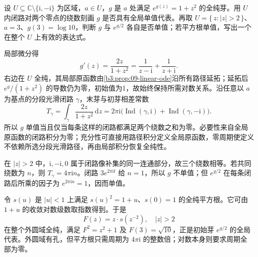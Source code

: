 \begin{exercise}\label{b3:ex:09-2}
设 \(U\subseteq\mathbb C\setminus\{\mathrm i,-\mathrm i\}\) 为区域，\(a\in U\)，\(g\) 是 \(a\) 处满足 \(e^{g(z)}=1+z^2\) 的全纯芽。用 \(U\) 内闭路对两个零点的绕数刻画 \(g\) 是否具有全局单值代表。再取 \(U=\{\,z:|z|>2\,\}\)、\(a=3\)、\(g(3)=\log10\)，判断 \(g\) 与 \(e^{g/2}\) 各自是否单值；若平方根单值，写出一个在整个 \(U\) 上有效的表达式。
\end{exercise}
\begin{solution}
局部微分得
\[
 g'(z)=\frac{2z}{1+z^2}
 =\frac1{z-\mathrm i}+\frac1{z+\mathrm i}.
\]
右边在 \(U\) 全纯，其局部原函数由\cref{b3:prop:09-linear-ode}沿所有路径延拓；延拓后 \(e^g/(1+z^2)\) 的导数仍为零，初始值为1，故始终保持所需对数关系。沿任意以 \(a\) 为基点的分段光滑闭路 \(\gamma\)，末芽与初芽相差常数
\[
 T_\gamma
 =\int_\gamma\frac{2z}{1+z^2}\,\mathrm dz
 =2\pi\mathrm i\bigl(\operatorname{Ind}(\gamma,\mathrm i)
                   +\operatorname{Ind}(\gamma,-\mathrm i)\bigr).
\]
所以 \(g\) 单值当且仅当每条这样的闭路都满足两个绕数之和为零。必要性来自全局原函数的闭路积分为零；充分性可直接用路径积分定义全局原函数，零周期使定义不依赖所选分段光滑路径，再由局部积分恢复全纯性。

在 \(|z|>2\) 中，\(\mathrm i,-\mathrm i,0\) 属于闭路像补集的同一连通部分，故三个绕数相等。若共同绕数为 \(n\)，则 \(T_\gamma=4\pi\mathrm i n\)。闭路 \(3e^{2\pi\mathrm i t}\) 给 \(n=1\)，所以 \(g\) 不单值；但 \(e^{g/2}\) 在每条闭路后所乘的因子为 \(e^{2\pi\mathrm i n}=1\)，因而单值。

令 \(s(u)\) 是 \(|u|<1\) 上满足 \(s(u)^2=1+u\)、\(s(0)=1\) 的全纯平方根。它可由 \(1+u\) 的收敛对数级数取指数得到。于是
\[
 F(z)=z\cdot s(z^{-2}),\quad |z|>2
\]
在整个外圆域全纯，满足 \(F^2=z^2+1\) 及 \(F(3)=\sqrt{10}\)，正是初始芽 \(e^{g/2}\) 的全局代表。外圆域有孔，但平方根只需周期为 \(4\pi\mathrm i\) 的整数倍；对数本身则要求周期全部为零。
\end{solution}

